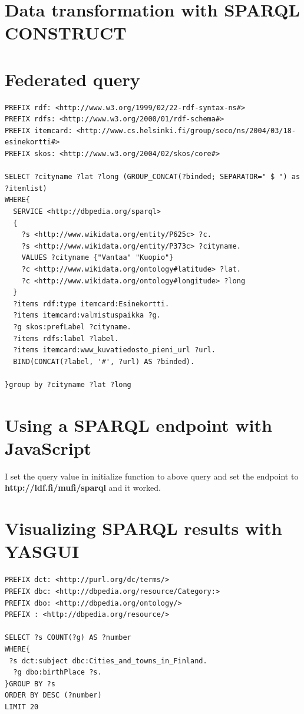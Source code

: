 \documentclass{article}
\begin{document}
\section{Data transformation with SPARQL CONSTRUCT}

\section{Federated query}

\begin{verbatim}
PREFIX rdf: <http://www.w3.org/1999/02/22-rdf-syntax-ns#>
PREFIX rdfs: <http://www.w3.org/2000/01/rdf-schema#>
PREFIX itemcard: <http://www.cs.helsinki.fi/group/seco/ns/2004/03/18-esinekortti#>
PREFIX skos: <http://www.w3.org/2004/02/skos/core#>

SELECT ?cityname ?lat ?long (GROUP_CONCAT(?binded; SEPARATOR=" $ ") as ?itemlist)
WHERE{
  SERVICE <http://dbpedia.org/sparql>
  {
	?s <http://www.wikidata.org/entity/P625c> ?c.
    ?s <http://www.wikidata.org/entity/P373c> ?cityname.
    VALUES ?cityname {"Vantaa" "Kuopio"}
    ?c <http://www.wikidata.org/ontology#latitude> ?lat.
  	?c <http://www.wikidata.org/ontology#longitude> ?long
  }
  ?items rdf:type itemcard:Esinekortti.
  ?items itemcard:valmistuspaikka ?g.
  ?g skos:prefLabel ?cityname.
  ?items rdfs:label ?label. 
  ?items itemcard:www_kuvatiedosto_pieni_url ?url.
  BIND(CONCAT(?label, '#', ?url) AS ?binded).
  
}group by ?cityname ?lat ?long
\end{verbatim}

\section{Using a SPARQL endpoint with JavaScript}

I set the query value in initialize function to above query and set the endpoint to \textbf{http://ldf.fi/mufi/sparql} and it worked.

\section{Visualizing SPARQL results with YASGUI}

\begin{verbatim}
PREFIX dct: <http://purl.org/dc/terms/>
PREFIX dbc: <http://dbpedia.org/resource/Category:>
PREFIX dbo: <http://dbpedia.org/ontology/>
PREFIX : <http://dbpedia.org/resource/>

SELECT ?s COUNT(?g) AS ?number
WHERE{
 ?s dct:subject dbc:Cities_and_towns_in_Finland.
  ?g dbo:birthPlace ?s.
}GROUP BY ?s
ORDER BY DESC (?number)
LIMIT 20
\end{verbatim}
\end{document}
